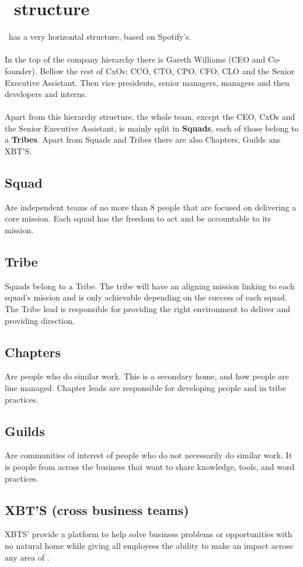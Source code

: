 \chapter{\company\ structure} 

\label{appendix_a}

\company\ has a very horizontal structure, based on Spotify's\cite{culture_of_growth}.
\\\\
In the top of the company hierarchy there is Gareth Williams (CEO and Co-founder). Bellow the rest of CxOs: CCO, CTO, CPO, CFO, CLO and the Senior Executive Assistant. Then vice presidents, senior managers, managers and then developers and interns\cite{crew_chart}.
\\\\
Apart from this hierarchy structure, the whole team, except the CEO, CxOs and the Senior Executive Assistant, is mainly split in \textbf{Squads}, each of those belong to a \textbf{Tribes}. Apart from Squads and Tribes there are also Chapters, Guilds ans XBT'S\cite{how_skyscanner_works}.

\section{Squad}

Are independent teams of no more than 8 people that are focused on delivering a core mission. Each squad has the freedom to act and be accountable to its mission.

\section{Tribe}

Squads belong to a Tribe. The tribe will have an aligning mission linking to each squad's mission and is only achievable depending on the success of each squad. The Tribe lead is responsible for providing the right environment to deliver and providing direction. 

\section{Chapters}

Are people who do similar work. This is a secondary home, and how people are line managed. Chapter leads are responsible for developing people and in tribe practices.

\section{Guilds}

Are communities of interest of people who do not necessarily do similar work. It is people from across the business that want to share knowledge, tools, and word practices. 

\section{XBT'S (cross business teams)}

XBTS' provide a platform to help solve business problems or opportunities with no natural home while giving all employees the ability to make an impact across any area of \company.